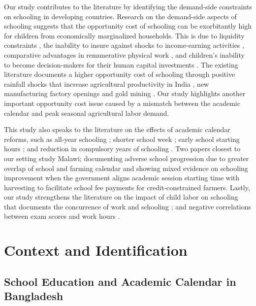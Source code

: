 \documentclass[12pt,letterpaper]{article}\usepackage[margin=1in]{geometry}
\newcommand{\0}{\ensuremath{\mbox{\boldmath $0$}}}
\begin{document}
Our study contributes to the literature by identifying the demand-side constraints on schooling in developing countries. Research on the demand-side aspects of schooling suggests that the opportunity cost of schooling can be exorbitantly high for children from economically marginalized households. This is due to liquidity constraints  \citep{JacobySkoufias1997, BeegleDehejiaGatti2006}, the inability to insure against shocks to income-earning activities \citep{Jensen2000, deJanvryetal2006, Case2006}, comparative advantages in remunerative physical work \citep{PittRosenzweigHassan2010}, and children's inability to become decision-makers for their human capital investments \citep{BalandRobinson2000}. The existing literature documents a higher opportunity cost of schooling through positive rainfall shocks that increase agricultural productivity in India \citep{shah2017drought}, new manufacturing factory openings \citep{atkin2016endogenous} and gold mining \citep{santos2018blessing}. Our study highlights another important opportunity cost issue caused by a mismatch between the academic calendar and peak seasonal agricultural labor demand.

This study also speaks to the literature on the effects of academic calendar reforms, such as all-year schooling \citep{ mcmullen2012impact, graves2010academic}; shorter school week \citep{anderson2015does}; early school starting hours \citep{cortes2012role,  hinrichs2011bell, edwards2012early, carrell2011s}; and reduction in compulsory years of schooling \citep{elsayed2021less}. Two papers closest to our setting study Malawi; \cite{allen2024double} documenting adverse school progression due to greater overlap of school and farming calendar and \cite{dillon2021selling} showing mixed evidence on schooling improvement when the government aligns academic session starting time with harvesting to facilitate school fee payments for credit-constrained farmers. Lastly, our study strengthens the literature on the impact of child labor on schooling that documents the concurrence of work and schooling \citep{RavallionWodon2000, Edmonds2007, Dumas2012}; and negative correlations between exam scores and work hours \citep{AkabayashiPsacharopoulos1999, Heady2003, Gunnarsson2006}.


\section{Context and Identification\label{sec.id}}
\subsection{School Education and Academic Calendar in Bangladesh}
\end{document}
